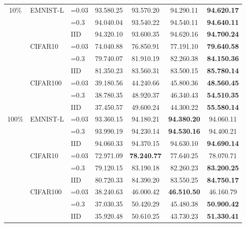 \documentclass[runningheads]{llncs}
\def\cifart{{\textsc{CIFAR10}}}
\def\cifarh{{\textsc{CIFAR100}}}
\def\emnist{{\textsc{EMNIST-L}}}
\begin{document}
\begin{table}[tb!]
\begin{center}
\begin{tabular}{cllcccc}
            \midrule
\multirow{9}{*}{10\%}
& \multirow{3}{*}{\emnist}
                  & =0.03 & 93.580.25 & 93.570.20 & 94.290.11 & \textbf{94.620.17} \\ 
                & & =0.3  & 94.040.04 & 93.540.22 & 94.540.11 & \textbf{94.640.11} \\  
                & & IID           & 94.320.10 & 93.600.35 & 94.620.16 & \textbf{94.700.24} \\
\cline{2-7}
& \multirow{3}{*}{\cifart}    
                  & =0.03 & 74.040.88 & 76.850.91 & 77.191.10 & \textbf{79.640.58} \\  
                & & =0.3  & 79.740.07 & 81.910.19 & 82.260.38 & \textbf{84.150.36} \\  
                & & IID           & 81.350.23 & 83.560.31 & 83.500.15 & \textbf{85.780.14} \\
\cline{2-7}
& \multirow{3}{*}{\cifarh}    
                  & =0.03 & 39.180.56 & 44.240.66 & 45.800.36 & \textbf{48.560.45} \\  
                & & =0.3  & 38.780.35 & 48.920.37 & 46.340.43 & \textbf{54.510.35} \\  
                & & IID           & 37.450.57 & 49.600.24 & 44.300.22 & \textbf{55.580.14} \\
            \midrule
\multirow{9}{*}{100\%}
& \multirow{3}{*}{\emnist}
                  & =0.03 & 93.360.15 & 94.180.21 & \textbf{94.380.20} & 94.060.11 \\  
                & & =0.3  & 93.990.19 & 94.230.14 & \textbf{94.530.16} & 94.400.21 \\  
                & & IID           & 94.060.33 & 94.370.15 & 94.630.10 & \textbf{94.690.14} \\
\cline{2-7}
& \multirow{3}{*}{\cifart}          
                  & =0.03 & 72.971.09 & \textbf{78.240.77} & 77.640.25 & 78.070.71 \\  
                & & =0.3  & 79.120.15 & 83.190.18 & 82.260.23 & \textbf{83.200.25} \\  
                & & IID           & 80.720.33 & 84.390.20 & 83.550.25 & \textbf{84.750.17} \\
\cline{2-7}
& \multirow{3}{*}{\cifarh}
                  & =0.03 & 38.240.63 & 46.000.42 & \textbf{46.510.50} & 46.160.79 \\  
                & & =0.3  & 37.030.35 & 50.420.29 & 45.480.38 & \textbf{50.900.42} \\  
                & & IID           & 35.920.48 & 50.610.25 & 43.730.23 & \textbf{51.330.41} \\
\end{tabular}
    \end{center}
\end{table}
 
\end{document}
